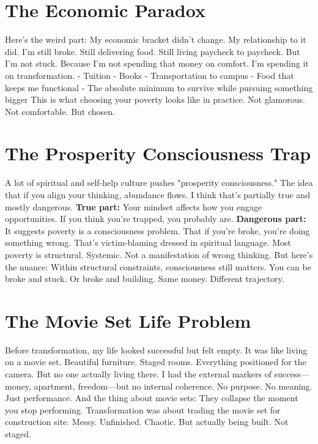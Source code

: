 \documentclass[12pt,openany]{book}
\begin{document}
\section{The Economic Paradox}

Here's the weird part:
My economic bracket didn't change. My relationship to it did.
I'm still broke. Still delivering food. Still living paycheck to paycheck.
But I'm not stuck.
Because I'm not spending that money on comfort. I'm spending it on transformation.
- Tuition
- Books
- Transportation to campus
- Food that keeps me functional
- The absolute minimum to survive while pursuing something bigger
This is what choosing your poverty looks like in practice.
Not glamorous. Not comfortable. But chosen.

\section{The Prosperity Consciousness Trap}

A lot of spiritual and self-help culture pushes "prosperity consciousness." The idea that if you align your thinking, abundance flows.
I think that's partially true and mostly dangerous.
\textbf{True part:} Your mindset affects how you engage opportunities. If you think you're trapped, you probably are.
\textbf{Dangerous part:} It suggests poverty is a consciousness problem. That if you're broke, you're doing something wrong.
That's victim-blaming dressed in spiritual language.
Most poverty is structural. Systemic. Not a manifestation of wrong thinking.
But here's the nuance:
Within structural constraints, consciousness still matters. You can be broke and stuck. Or broke and building.
Same money. Different trajectory.

\section{The Movie Set Life Problem}

Before transformation, my life looked successful but felt empty.
It was like living on a movie set.
Beautiful furniture. Staged rooms. Everything positioned for the camera. But no one actually living there.
I had the external markers of success—money, apartment, freedom—but no internal coherence. No purpose. No meaning.
Just performance.
And the thing about movie sets: They collapse the moment you stop performing.
Transformation was about trading the movie set for construction site.
Messy. Unfinished. Chaotic. But actually being built. Not staged.
\end{document}
